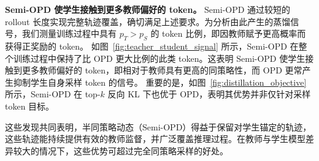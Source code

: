 \noindent \textbf{Semi-OPD 使学生接触到更多教师偏好的 token。}  
Semi-OPD 通过较短的 rollout 长度实现完整轨迹覆盖，确切满足上述要求。为分析由此产生的蒸馏信号，我们测量训练过程中具有 $p_T > p_S$ 的 token 比例，即因教师赋予更高概率而获得正奖励的 token。  
如图~\ref{fig:teacher_student_signal} 所示，Semi-OPD 在整个训练过程中保持了比 OPD 更大比例的此类 token。这表明 Semi-OPD 使学生接触到更多教师偏好的 token，即相对于教师具有更高的同策略性，而 OPD 更常产生抑制学生自身采样 token 的信号。  
重要的是，如图~\ref{fig:distillation_objective} 所示，Semi-OPD 在 top-$k$ 反向 KL 下也优于 OPD，表明其优势并非仅针对采样 token 目标。


这些发现共同表明，半同策略动态（Semi-OPD）得益于保留对学生锚定的轨迹，这些轨迹能持续提供有效的教师监督，并广泛覆盖推理过程。在教师与学生模型差异较大的情况下，这些优势可超过完全同策略采样的好处。





































